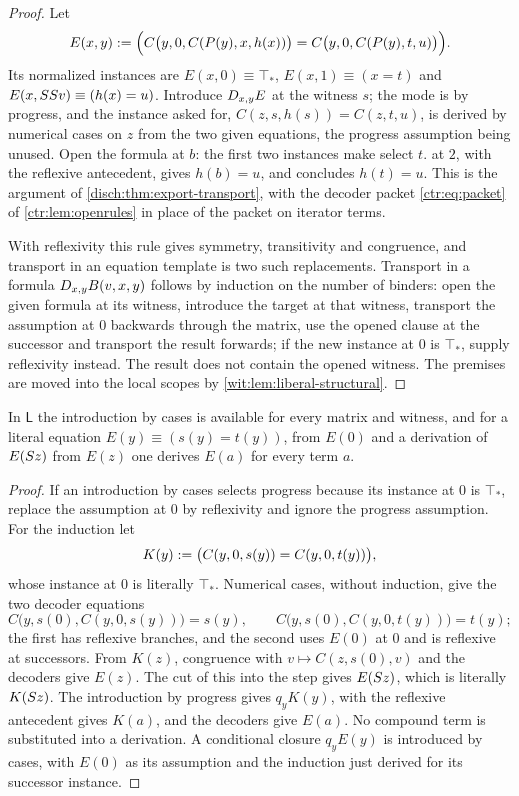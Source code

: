 \begin{proof}
Let
\[
 E(x,y)\mathrel{:=}\Bigl(C\bigl(y,0,C(P(y),x,h(x))\bigr)
   =C\bigl(y,0,C(P(y),t,u)\bigr)\Bigr).
\]
Its normalized instances are $E(x,0)\equiv\top_{*}$, $E(x,1)\equiv(x=t)$
and $E(x,SS v)\equiv(h(x)=u)$.  Introduce $D_{x,y}E$ at the witness
$s$; the mode is by progress, and the instance asked for,
$C(z,s,h(s))=C(z,t,u)$, is derived by numerical cases on $z$ from the two
given equations, the progress assumption being unused.  Open the formula at
$b$: the first two instances make  select $t$.
 at $2$, with the reflexive antecedent, gives $h(b)=u$, and
 concludes $h(t)=u$.  This is the argument of
\cref{disch:thm:export-transport}, with the decoder packet
\eqref{ctr:eq:packet} of \cref{ctr:lem:openrules} in place of the packet on
iterator terms.

With reflexivity this rule gives symmetry, transitivity and congruence, and
transport in an equation template is two such replacements.  Transport in a
formula $D_{x,y}B(v,x,y)$ follows by induction on the number of binders:
open the given formula at its witness, introduce the target at that
witness, transport the assumption at $0$ backwards through the matrix, use
the opened clause at the successor and transport the result forwards; if
the new instance at $0$ is $\top_{*}$, supply reflexivity instead.  The
result does not contain the opened witness.  The premises are moved into the
local scopes by \cref{wit:lem:liberal-structural}.
\end{proof}

\begin{lemma}
\label{wit:lem:liberal-induction}
In $\mathsf{L}$ the introduction by cases is available for every matrix and
witness, and for a literal equation $E(y)\equiv(s(y)=t(y))$, from $E(0)$
and a derivation of $E(S z)$ from $E(z)$ one derives $E(a)$ for every
term $a$.
\end{lemma}

\begin{proof}
If an introduction by cases selects progress because its instance at $0$ is
$\top_{*}$, replace the assumption at $0$ by reflexivity and ignore the
progress assumption.  For the induction let
\[
 K(y)\mathrel{:=}\bigl(C(y,0,s(y))=C(y,0,t(y))\bigr),
\]
whose instance at $0$ is literally $\top_{*}$.  Numerical cases, without
induction, give the two decoder equations
\[
 C\bigl(y,s(0),C(y,0,s(y))\bigr)=s(y),\qquad
 C\bigl(y,s(0),C(y,0,t(y))\bigr)=t(y);
\]
the first has reflexive branches, and the second uses $E(0)$ at $0$ and is
reflexive at successors.  From $K(z)$, congruence with
$v\mapsto C(z,s(0),v)$ and the decoders give $E(z)$.  The cut of this into
the step gives $E(S z)$, which is literally $K(S z)$.  The
introduction by progress gives $q_yK(y)$,  with the reflexive
antecedent gives $K(a)$, and the decoders give $E(a)$.  No compound term is
substituted into a derivation.  A conditional closure $q_yE(y)$ is
introduced by cases, with $E(0)$ as its assumption and the induction just
derived for its successor instance.
\end{proof}

